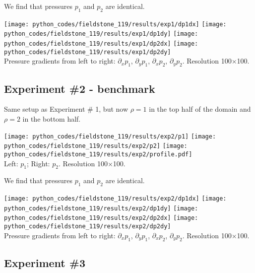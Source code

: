 We find that pressures $p_1$ and $p_2$ are identical.
\begin{center}
\texttt{[image: python\_codes/fieldstone\_119/results/exp1/dp1dx]}
\texttt{[image: python\_codes/fieldstone\_119/results/exp1/dp1dy]}
\texttt{[image: python\_codes/fieldstone\_119/results/exp1/dp2dx]}
\texttt{[image: python\_codes/fieldstone\_119/results/exp1/dp2dy]}\\
{\captionfont 
Pressure gradients from left to right: $\partial_xp_1$, $\partial_yp_1$, $\partial_xp_2$, $\partial_yp_2$. 
Resolution 100$\times$100.}
\end{center}

\subsection*{Experiment \#2 - benchmark}

Same setup as Experiment \# 1, but now $\rho=1$ in the top half of the domain and $\rho=2$ in the bottom half.

\begin{center}
\texttt{[image: python\_codes/fieldstone\_119/results/exp2/p1]}
\texttt{[image: python\_codes/fieldstone\_119/results/exp2/p2]}
\texttt{[image: python\_codes/fieldstone\_119/results/exp2/profile.pdf]}\\
{\captionfont Left: $p_1$; Right: $p_2$. Resolution 100$\times$100.}
\end{center}

We find that pressures $p_1$ and $p_2$ are identical.

\begin{center}
\texttt{[image: python\_codes/fieldstone\_119/results/exp2/dp1dx]}
\texttt{[image: python\_codes/fieldstone\_119/results/exp2/dp1dy]}
\texttt{[image: python\_codes/fieldstone\_119/results/exp2/dp2dx]}
\texttt{[image: python\_codes/fieldstone\_119/results/exp2/dp2dy]}\\
{\captionfont 
Pressure gradients from left to right: $\partial_xp_1$, $\partial_yp_1$, $\partial_xp_2$, $\partial_yp_2$. 
Resolution 100$\times$100.}
\end{center}

\newpage
\subsection*{Experiment \#3}

